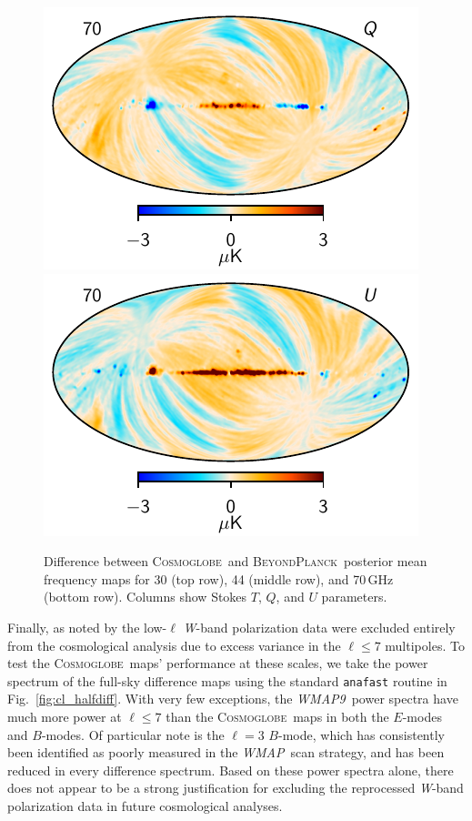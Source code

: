 \documentclass[twocolumn]{../../common/aa}
\def\WMAP{\emph{WMAP}}
\def\WMAPnine{\emph{WMAP9}}
\newcommand{\bp}{\textsc{BeyondPlanck}}
\newcommand{\cosmoglobe}{\textsc{Cosmoglobe}}
\newcommand{\W}[0]{\textit W}
\begin{document}
\begin{figure}[t]
  \includegraphics[width=0.33\linewidth]{figures/diff_CG_BP_70_2deg_Q.pdf}
  \includegraphics[width=0.33\linewidth]{figures/diff_CG_BP_70_2deg_U.pdf}  
  \caption{Difference between \cosmoglobe\ and \bp\ posterior mean frequency maps for 30 (top row), 44 (middle row), and 70\,GHz (bottom row). Columns show Stokes $T$, $Q$, and $U$ parameters. }
  \label{fig:lfi_comparison}
\end{figure}



Finally, as noted by \citet{jarosik2010} the low-$\ell$ \W-band polarization data were excluded entirely from the cosmological analysis due to excess variance in the $\ell\leq7$ multipoles. To test the \cosmoglobe\ maps' performance at these scales, we take the power spectrum of the full-sky difference maps using the standard \texttt{anafast} routine in Fig.~\ref{fig:cl_halfdiff}. With very few exceptions, the \WMAPnine\ power spectra have much more power at $\ell\leq7$ than the \cosmoglobe\ maps in both the $E$-modes and $B$-modes. Of particular note is the $\ell=3$ $B$-mode, which has consistently been identified as poorly measured in the \WMAP\ scan strategy, and has been reduced in every difference spectrum. Based on these power spectra alone, there does not appear to be a strong justification for excluding the reprocessed \W-band polarization data in future cosmological analyses.
\end{document}
